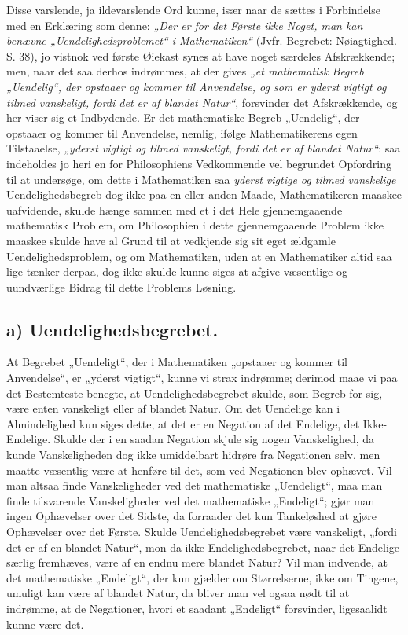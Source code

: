 \documentclass[12pt,a4paper]{book}
\begin{document}
Disse varslende, ja ildevarslende Ord kunne, især naar de sættes i
Forbindelse med en Erklæring som denne: \emph{„Der er for det Første
ikke Noget, man kan benævne „Uendelighedsproblemet“ i Mathematiken“}
(Jvfr. Begrebet: Nøiagtighed. S. 38), jo vistnok ved første Øiekast
synes at have noget særdeles Afskrækkende; men, naar det saa derhos
indrømmes, at der gives \emph{„et mathematisk Begreb „Uendelig“, der
opstaaer og kommer til Anvendelse, og som er yderst vigtigt og tilmed
vanskeligt, fordi det er af blandet Natur“}, forsvinder det
Afskrækkende, og her viser sig et Indbydende. Er det mathematiske
Begreb „Uendelig“, der opstaaer og kommer til Anvendelse, nemlig,
ifølge Mathematikerens egen Tilstaaelse, \emph{„yderst vigtigt og
tilmed vanskeligt, fordi det er af blandet Natur“}: saa indeholdes jo
heri en for Philosophiens Vedkommende
vel begrundet Opfordring til at undersøge, om dette i Mathematiken saa
\emph{yderst vigtige og tilmed vanskelige} Uendelighedsbegreb
dog ikke paa en eller anden Maade, Mathematikeren maaskee uafvidende,
skulde hænge sammen med et i det Hele gjennemgaaende mathematisk
Problem, om Philosophien i dette gjennemgaaende Problem ikke maaskee
skulde have al Grund til at vedkjende sig sit eget ældgamle
Uendelighedsproblem, og om Mathematiken, uden at en Mathematiker altid
saa lige tænker derpaa, dog ikke skulde kunne siges at afgive
væsentlige og uundværlige Bidrag til dette Problems Løsning.

\subsection*{a) Uendelighedsbegrebet.}

At Begrebet „Uendeligt“, der i Mathematiken „opstaaer og kommer til
Anvendelse“, er „yderst vigtigt“, kunne vi strax indrømme; derimod
maae vi paa det Bestemteste benegte, at Uendelighedsbegrebet skulde,
som Begreb for sig, være enten vanskeligt eller af blandet Natur. Om
det Uendelige kan i Almindelighed kun siges dette, at det er en
Negation af det Endelige, det Ikke-Endelige. Skulde der i en saadan
Negation skjule sig nogen Vanskelighed, da kunde Vanskeligheden dog
ikke umiddelbart hidrøre fra Negationen selv, men maatte væsentlig
være at henføre til det, som ved Negationen blev ophævet. Vil man
altsaa finde Vanskeligheder ved det mathematiske „Uendeligt“, maa man
finde tilsvarende Vanskeligheder ved det mathematiske „Endeligt“; gjør
man ingen Ophævelser over det Sidste, da forraader det kun
Tankeløshed at gjøre Ophævelser over det Første. Skulde
Uendelighedsbegrebet være vanskeligt, „fordi det er af en blandet
Natur“, mon da ikke Endelighedsbegrebet, naar det Endelige særlig
fremhæves, være af en endnu mere blandet Natur? Vil man indvende, at
det mathematiske „Endeligt“, der kun gjælder om Størrelserne, ikke om
Tingene, umuligt kan være af blandet Natur, da bliver man vel ogsaa
nødt
til at indrømme, at de Negationer, hvori et saadant „Endeligt“
forsvinder, ligesaalidt kunne være det.
\end{document}
